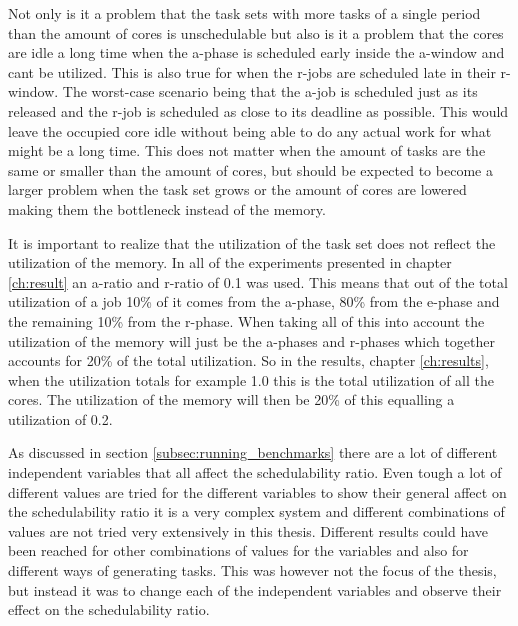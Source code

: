 \documentclass{kththesis}
\begin{document}
Not only is it a problem that the task sets with more tasks of a single period than the amount of
cores is unschedulable but also is it a problem that the cores are idle a long time when the
\acrshort{a}-phase is scheduled early inside the \acrshort{a}-window and cant be utilized. This is
also true for when the \acrshort{r}-jobs are scheduled late in their \acrshort{r}-window. The
worst-case scenario being that the \acrshort{a}-job is scheduled just as its released and the
\acrshort{r}-job is scheduled as close to its deadline as possible. This would leave the occupied
core idle without being able to do any actual work for what might be a long time. This does not
matter when the amount of tasks are the same or smaller than the amount of cores, but should be
expected to become a larger problem when the task set grows or the amount of cores are lowered
making them the bottleneck instead of the memory.

It is important to realize that the utilization of the task set does not reflect the utilization of
the memory. In all of the experiments presented in chapter \ref{ch:result} an \acrshort{a}-ratio and
\acrshort{r}-ratio of 0.1 was used. This means that out of the total utilization of a job 10\% of it
comes from the \acrshort{a}-phase, 80\% from the \acrshort{e}-phase and the remaining 10\% from the
\acrshort{r}-phase. When taking all of this into account the utilization of the memory will just be
the \acrshort{a}-phases and \acrshort{r}-phases which together accounts for 20\% of the total
utilization. So in the results, chapter \ref{ch:results}, when the utilization totals for
example 1.0 this is the total utilization of all the cores. The utilization of the memory will then
be 20\% of this equalling a utilization of 0.2.

As discussed in section \ref{subsec:running_benchmarks} there are a lot of different independent
variables that all affect the schedulability ratio. Even tough a lot of different values are tried
for the different variables to show their general affect on the schedulability ratio it is a very
complex system and different combinations of values are not tried very extensively in this thesis.
Different results could  have been reached for other combinations of values for the
variables and also for different ways of generating tasks. This was however not the focus of the
thesis, but instead it was to change each of the independent variables and observe their effect on
the schedulability ratio.
\end{document}
